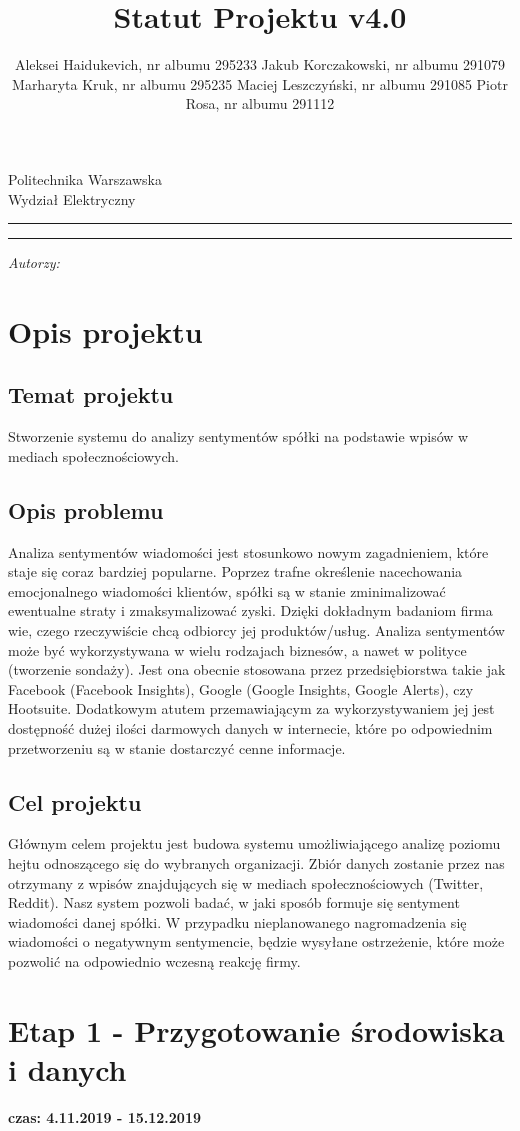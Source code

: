 \documentclass[a4paper,11pt, notitlepage ]{article}
\author{Aleksei Haidukevich, nr albumu 295233 \newline Jakub Korczakowski, nr albumu 291079 \newline Marharyta Kruk, nr albumu 295235 \newline Maciej Leszczyński, nr albumu 291085 \newline Piotr Rosa, nr albumu 291112\\[50ex]}
\title{Statut Projektu v4.0}
\makeatletter
\newcommand{\linia}{\rule{\linewidth}{0.4mm}}
\renewcommand{\maketitle}{\begin{titlepage}
    \vspace*{1cm}
    \begin{center}\small
    Politechnika Warszawska\\
    Wydział Elektryczny
    \end{center}
    \vspace{3cm}
    \noindent\linia
    \begin{center}
      \LARGE \textsc{\@title}
         \end{center}
     \linia
    \vspace{0.5cm}
    \begin{flushright}
    \begin{minipage}{8cm}
    \textit{\small Autorzy:}\\
    \normalsize \textsc{\@author} \par
    \end{minipage}
    \end{flushright}
    \vspace*{\stretch{6}}
    \begin{center}
    \@date
    \end{center}
  \end{titlepage}%
}
\makeatother
\begin{document}
  \maketitle
  \setcounter{page}{2}
  \tableofcontents
  \newpage

\section{Opis projektu}
\subsection{Temat projektu}
Stworzenie systemu do analizy sentymentów spółki na podstawie wpisów w mediach
społecznościowych.

\subsection{Opis problemu}
Analiza sentymentów wiadomości jest stosunkowo nowym zagadnieniem, które staje się coraz bardziej popularne. Poprzez trafne określenie nacechowania emocjonalnego wiadomości klientów, spółki są w stanie zminimalizować ewentualne straty i zmaksymalizować zyski. Dzięki dokładnym badaniom firma wie, czego rzeczywiście chcą odbiorcy jej produktów/usług. Analiza sentymentów może być wykorzystywana w wielu rodzajach biznesów, a nawet w polityce (tworzenie sondaży). Jest ona obecnie stosowana przez przedsiębiorstwa takie jak Facebook (Facebook Insights), Google (Google Insights, Google Alerts), czy Hootsuite. Dodatkowym atutem przemawiającym za wykorzystywaniem jej jest dostępność dużej ilości darmowych danych w internecie, które po odpowiednim przetworzeniu są w stanie dostarczyć cenne informacje.

\subsection{Cel projektu}
Głównym celem projektu jest budowa systemu umożliwiającego analizę poziomu hejtu odnoszącego się do wybranych organizacji. Zbiór danych zostanie przez nas otrzymany z wpisów znajdujących się w mediach społecznościowych (Twitter, Reddit). Nasz system pozwoli badać, w jaki sposób formuje się sentyment wiadomości danej spółki. W przypadku nieplanowanego nagromadzenia się wiadomości o negatywnym sentymencie, będzie wysyłane ostrzeżenie, które może pozwolić na odpowiednio wczesną reakcję firmy. 

\section{Etap 1 - Przygotowanie środowiska i danych}
\textbf{czas: 4.11.2019 - 15.12.2019}
\end{document}
